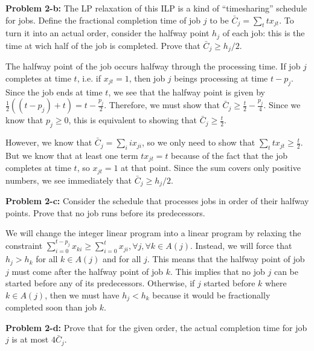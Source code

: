 \documentclass[psamsfonts]{amsart}
\newenvironment{sol}{\vspace{0.25cm}{\large \bfseries Solution:}}{\qedsymbol}
\newenvironment{prob}[1]{\begin{framed}{\large \bfseries Problem #1:}}{\end{framed}}
\begin{document}
\begin{prob}{2-b}
The LP relaxation of this ILP is a kind of ``timesharing'' schedule for jobs. Define the fractional completion time of job $j$ to be $\bar{C}_{j} = \sum_{t} t x_{jt}$. To turn it into an actual order, consider the halfway point $h_j$ of each job: this is the time at wich half of the job is completed. Prove that $\bar{C}_j \geq h_j / 2$.
\end{prob}
\begin{sol}
The halfway point of the job occurs halfway through the processing time. If job $j$ completes at time $t$, i.e. if $x_{jt} = 1$, then job $j$ beings processing at time $t - p_j$. Since the job ends at time $t$, we see that the halfway point is given by $\frac{1}{2}\left((t - p_j) + t \right) = t - \frac{p_j}{2}$. Therefore, we must show that $\bar{C}_j \geq \frac{t}{2} - \frac{p_j}{4}$. Since we know that $p_{j} \geq 0$, this is equivalent to showing that $\bar{C}_j \geq \frac{t}{2}$. 

However, we know that $\bar{C}_{j} = \sum_{i} i x_{ji}$, so we only need to show that $\sum_{t} t x_{jt} \geq \frac{t}{2}$. But we know that at least one term $t x_{jt} = t$ because of the fact that the job completes at time $t$, so $x_{jt} = 1$ at that point. Since the sum covers only positive numbers, we see immediately that $\bar{C}_j \geq h_j / 2$.
\end{sol}

\begin{prob}{2-c}
Consider the schedule that processes jobs in order of their halfway points. Prove that no job runs before its predecessors.
\end{prob}
\begin{sol}
We will change the integer linear program into a linear program by relaxing the constraint $\sum_{i=0}^{t - p_j} x_{ki} \geq \sum_{i=0}^t x_{ji}, \forall j, \forall k \in A(j)$. Instead, we will force that $h_{j} > h_k$ for all $k \in A(j)$ and for all $j$. This means that the halfway point of job $j$ must come after the halfway point of job $k$. This implies that no job $j$ can be started before any of its predecessors. Otherwise, if $j$ started before $k$ where $k \in A(j)$, then we must have $h_j < h_k$ because it would be fractionally completed soon than job $k$. 
\end{sol}

\begin{prob}{2-d}
Prove that for the given order, the actual completion time for job $j$ is at most $4 \bar{C}_j$. 
\end{prob}
\end{document}

